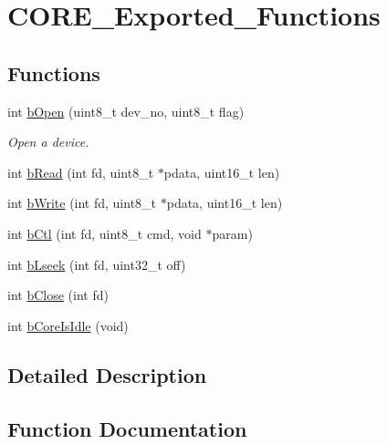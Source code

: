 \hypertarget{group___c_o_r_e___exported___functions}{}\section{C\+O\+R\+E\+\_\+\+Exported\+\_\+\+Functions}
\label{group___c_o_r_e___exported___functions}
\subsection*{Functions}
\begin{DoxyCompactItemize}
\item 
int \mbox{\hyperlink{group___c_o_r_e___exported___functions_ga249e47165f733672eae3653fcca87829}{b\+Open}} (uint8\+\_\+t dev\+\_\+no, uint8\+\_\+t flag)
\begin{DoxyCompactList}\small\item\em Open a device. \end{DoxyCompactList}\item 
int \mbox{\hyperlink{group___c_o_r_e___exported___functions_ga19ddb6f8ca523b3b28b74ea6a1519e3b}{b\+Read}} (int fd, uint8\+\_\+t $\ast$pdata, uint16\+\_\+t len)
\item 
int \mbox{\hyperlink{group___c_o_r_e___exported___functions_ga078b200cdc68be6d562cc1ad323d9381}{b\+Write}} (int fd, uint8\+\_\+t $\ast$pdata, uint16\+\_\+t len)
\item 
int \mbox{\hyperlink{group___c_o_r_e___exported___functions_gaf0a95eb51c436b56de56cdc63f5dab7c}{b\+Ctl}} (int fd, uint8\+\_\+t cmd, void $\ast$param)
\item 
int \mbox{\hyperlink{group___c_o_r_e___exported___functions_gad49412624e7b58f0b90ff43e60823eb1}{b\+Lseek}} (int fd, uint32\+\_\+t off)
\item 
int \mbox{\hyperlink{group___c_o_r_e___exported___functions_ga2d5143bd4493f8069401bb433939de4f}{b\+Close}} (int fd)
\item 
int \mbox{\hyperlink{group___c_o_r_e___exported___functions_ga2579ab6e79fad3d62796972ab85a14f0}{b\+Core\+Is\+Idle}} (void)
\end{DoxyCompactItemize}


\subsection{Detailed Description}


\subsection{Function Documentation}
\mbox{\label{group___c_o_r_e___exported___functions_ga2d5143bd4493f8069401bb433939de4f}} 
